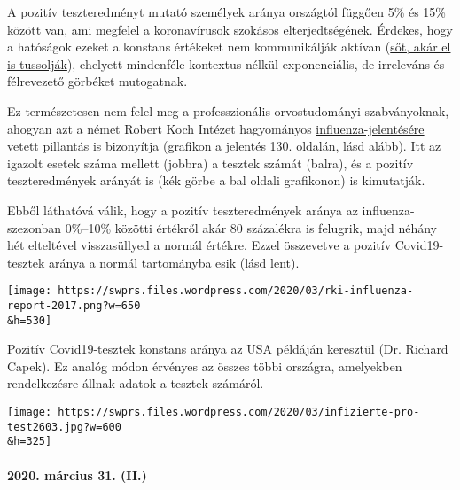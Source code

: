 A pozitív teszteredményt mutató személyek aránya országtól függően 5\%
és 15\% között van, ami megfelel a koronavírusok szokásos
elterjedtségének. Érdekes, hogy a hatóságok ezeket a konstans értékeket
nem kommunikálják aktívan
(\href{https://multipolar-magazin.de/artikel/coronavirus-irrefuhrung-fallzahlen}{sőt,
akár el is tussolják}), ehelyett mindenféle kontextus nélkül
exponenciális, de irreleváns és félrevezető görbéket mutogatnak.

Ez természetesen nem felel meg a professzionális orvostudományi
szabványoknak, ahogyan azt a német Robert Koch Intézet hagyományos
\href{https://influenza.rki.de/Saisonberichte/2017.pdf}{influenza-jelentésére}
vetett pillantás is bizonyítja (grafikon a jelentés 130. oldalán, lásd
alább). Itt az igazolt esetek száma mellett (jobbra) a tesztek számát
(balra), és a pozitív teszteredmények arányát is (kék görbe a bal oldali
grafikonon) is kimutatják.

Ebből láthatóvá válik, hogy a pozitív teszteredmények aránya az
influenza-szezonban 0\%--10\% közötti értékről akár 80 százalékra is
felugrik, majd néhány hét elteltével visszasüllyed a normál értékre.
Ezzel összevetve a pozitív Covid19-tesztek aránya a normál tartományba
esik (lásd lent).

\texttt{[image: https://swprs.files.wordpress.com/2020/03/rki-influenza-report-2017.png?w=650\\\&h=530]}

Pozitív Covid19-tesztek konstans aránya az USA példáján keresztül (Dr.
Richard Capek). Ez analóg módon érvényes az összes többi országra,
amelyekben rendelkezésre állnak adatok a tesztek számáról.

\texttt{[image: https://swprs.files.wordpress.com/2020/03/infizierte-pro-test2603.jpg?w=600\\\&h=325]}

\hypertarget{2020-muxe1rcius-31-ii}{%
\paragraph{2020. március 31. (II.)}\label{2020-muxe1rcius-31-ii}}

